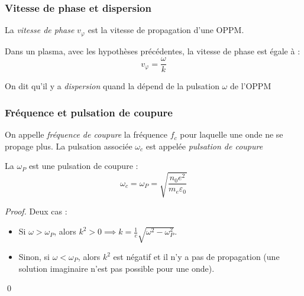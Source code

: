 \documentclass[11pt,a4paper,fleqn,pdftex]{report}
\begin{document}
\subsubsection{Vitesse de phase et dispersion} %
\label{ssub:vitesse_de_phase_et_dispersion}
\begin{dfn}
   La \emph{vitesse de phase} $v_\varphi$ est la vitesse de propagation d'une \gls{OPPM}.
\end{dfn}
\begin{theorem}
   Dans un plasma, avec les hypothèses précédentes, la vitesse de phase est égale à :
   \begin{equation}
   v_\varphi = \dfrac{\omega}{k}
   \end{equation}
   
\end{theorem}
\begin{dfn}
   On dit qu'il y a \emph{dispersion} quand la  dépend de la pulsation $\omega$ de l'\gls{OPPM}
\end{dfn}
\subsubsection{Fréquence et pulsation de coupure} %
\label{ssub:frequence_pulsation_de_coupure}
\begin{dfn}
   On appelle \emph{fréquence de coupure} la fréquence $f_c$ pour laquelle une onde ne se propage plus. La pulsation associée $\omega_c$ est appelée \emph{pulsation de coupure}
\end{dfn}
\begin{theorem}
   La  $\omega_P$ est une pulsation de coupure : 
   \begin{equation}
   \omega_c = \omega_P = \sqrt{\dfrac{n_0 e^2}{m_e \varepsilon_0}}
   \end{equation}
\end{theorem}
\begin{proof}
  Deux cas :
  \begin{itemize}
    \item Si $\omega > \omega_P$, alors $k^2 > 0 \implies k=\frac{1}{c} \sqrt{\omega^2 - \omega_P^2}$.
    \item Sinon, si $\omega < \omega_P$, alors $k^2$ est négatif et il n'y a pas de propagation (une solution imaginaire n'est pas possible pour une onde).
  \end{itemize}
  \qed
\end{proof}
\end{document}

